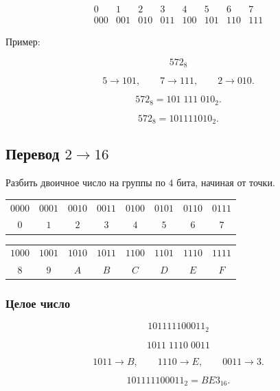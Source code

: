 \documentclass[../final.tex]{subfiles}
\begin{document}
\[
\begin{array}{cccccccc}
0&1&2&3&4&5&6&7\\[1mm]
000&001&010&011&100&101&110&111
\end{array}
\]

Пример:

\[
572_8
\]

\[
5\longrightarrow101,
\qquad
7\longrightarrow111,
\qquad
2\longrightarrow010.
\]

\[
572_8
=
101\;111\;010_2.
\]

\[
572_8=101111010_2.
\]



\subsection{Перевод \texorpdfstring{$2 \to 16$}{2 → 16}}

Разбить двоичное число на группы по $4$ бита,
начиная от точки.

\medskip

\begin{center}
\renewcommand{\arraystretch}{1.2}
\begin{tabular}{cccccccc}
$0000$ & $0001$ & $0010$ & $0011$ &
$0100$ & $0101$ & $0110$ & $0111$ \\

$0$ & $1$ & $2$ & $3$ &
$4$ & $5$ & $6$ & $7$
\end{tabular}

\vspace{2mm}

\begin{tabular}{cccccccc}
$1000$ & $1001$ & $1010$ & $1011$ &
$1100$ & $1101$ & $1110$ & $1111$ \\

$8$ & $9$ & $A$ & $B$ &
$C$ & $D$ & $E$ & $F$
\end{tabular}
\end{center}


\subsubsection{Целое число}

\[
101111100011_2
\]

\[
1011\;1110\;0011
\]

\[
1011\longrightarrow B,
\qquad
1110\longrightarrow E,
\qquad
0011\longrightarrow3.
\]

\[
101111100011_2=BE3_{16}.
\]
\end{document}
